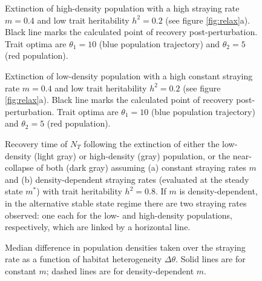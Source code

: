 \documentclass{revtex4}
\begin{document}
\begin{figure}
  \captionsetup{justification=raggedright,
singlelinecheck=false
}
\centering
\caption{
Extinction of high-density population with a high straying rate $m=0.4$ and low trait heritability $h^2=0.2$ (see figure \ref{fig:relax}a).
Black line marks the calculated point of recovery post-perturbation.
Trait optima are $\theta_1 = 10$ (blue population trajectory) and $\theta_2 = 5$ (red population).
} \label{fig:relaxtraj_hdlh}
\end{figure}


\begin{figure}
  \captionsetup{justification=raggedright,
singlelinecheck=false
}
\centering
\caption{
Extinction of low-density population with a high constant straying rate $m=0.4$ and low trait heritability $h^2=0.2$ (see figure \ref{fig:relax}a).
Black line marks the calculated point of recovery post-perturbation.
Trait optima are $\theta_1 = 10$ (blue population trajectory) and $\theta_2 = 5$ (red population).
} \label{fig:relaxtraj_ldlh}
\end{figure}



\begin{figure}
  \captionsetup{justification=raggedright,
singlelinecheck=false
}
\centering
\caption{
Recovery time of $N_T$ following the extinction of either the low-density (light gray) or high-density (gray) population, or the near-collapse of both (dark gray) assuming (a) constant straying rates $m$ and (b) density-dependent straying rates (evaluated at the steady state $m^*$) with trait heritability $h^2=0.8$.
If $m$ is density-dependent, in the alternative stable state regime there are two straying rates observed: one each for the low- and high-density populations, respectively, which are linked by a horizontal line.
} \label{fig:relax_highh}
\end{figure}

\clearpage


\begin{figure}
  \captionsetup{justification=raggedright,
singlelinecheck=false
}
\centering
\caption{
Median difference in population densities taken over the straying rate as a function of habitat heterogeneity $\Delta\theta$.
Solid lines are for constant $m$; dashed lines are for density-dependent $m$.} \label{fig:thetadiffN}
\end{figure}
\end{document}
